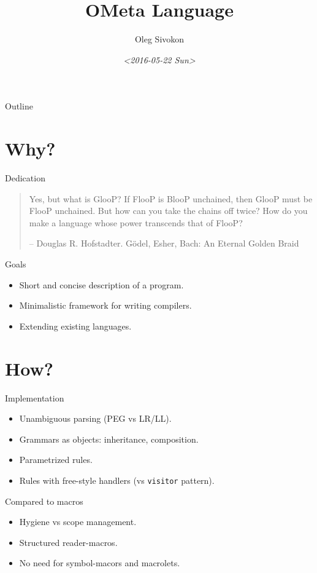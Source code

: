 \documentclass[presentation,10pt]{beamer}
\author{Oleg Sivokon}
\date{\textit{<2016-05-22 Sun>}}
\title{OMeta Language}
\begin{document}
\maketitle
\begin{frame}{Outline}
\tableofcontents
\end{frame}


\section{Why?}
\label{sec-1}

\begin{frame}[label=sec-1-1]{Dedication}
\begin{quote}
Yes, but what is GlooP? If FlooP is BlooP unchained, then GlooP must
be FlooP unchained. But how can you take the chains off twice? How
do you make a language whose power transcends that of FlooP?

-- \alert{Douglas R. Hofstadter. Gödel, Esher, Bach: An Eternal Golden Braid}
\end{quote}
\end{frame}

\begin{frame}[label=sec-1-2]{Goals}
\begin{itemize}
\item Short and concise description of a program.
\item Minimalistic framework for writing compilers.
\item Extending existing languages.
\end{itemize}
\end{frame}

\section{How?}
\label{sec-2}

\begin{frame}[fragile,label=sec-2-1]{Implementation}
 \begin{itemize}
\item Unambiguous parsing (PEG vs LR/LL).
\item Grammars as objects: inheritance, composition.
\item Parametrized rules.
\item Rules with free-style handlers (vs \texttt{visitor} pattern).
\end{itemize}
\end{frame}

\begin{frame}[label=sec-2-2]{Compared to macros}
\begin{itemize}
\item Hygiene vs scope management.
\item Structured reader-macros.
\item No need for symbol-macors and macrolets.
\end{itemize}
\end{frame}
\end{document}
